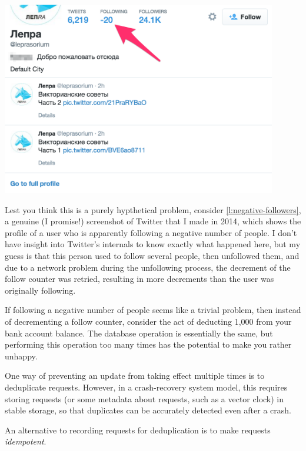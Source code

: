 \begin{frame}
    \label{s:negative-followers}
    \includegraphics[width=12cm]{images/negative-followers.png}
\end{frame}
\label{l:negative-followers}

Lest you think this is a purely hypthetical problem, consider \autoref{l:negative-followers}, a genuine (I promise!) screenshot of Twitter that I made in 2014, which shows the profile of a user who is apparently following a negative number of people.
I don't have insight into Twitter's internals to know exactly what happened here, but my guess is that this person used to follow several people, then unfollowed them, and due to a network problem during the unfollowing process, the decrement of the follow counter was retried, resulting in more decrements than the user was originally following.

If following a negative number of people seems like a trivial problem, then instead of decrementing a follow counter, consider the act of deducting {\textsterling}1,000 from your bank account balance.
The database operation is essentially the same, but performing this operation too many times has the potential to make you rather unhappy.

One way of preventing an update from taking effect multiple times is to deduplicate requests.
However, in a crash-recovery system model, this requires storing requests (or some metadata about requests, such as a vector clock) in stable storage, so that duplicates can be accurately detected even after a crash.

An alternative to recording requests for deduplication is to make requests \emph{idempotent}.

